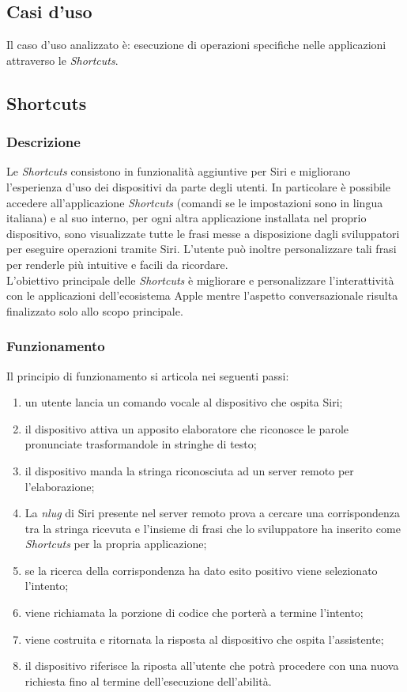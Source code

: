 	\subsection{Casi d'uso}
	Il caso d'uso analizzato è: esecuzione di operazioni specifiche nelle applicazioni attraverso le \emph{Shortcuts}.
	\subsection{Shortcuts}
		\subsubsection{Descrizione}
		Le \emph{Shortcuts} consistono in funzionalità aggiuntive per Siri e migliorano l'esperienza d'uso dei dispositivi da parte degli utenti. In particolare è possibile accedere all'applicazione \emph{Shortcuts} (comandi se le impostazioni sono in lingua italiana) e al suo interno, per ogni altra applicazione installata nel proprio dispositivo, sono visualizzate tutte le frasi messe a disposizione dagli sviluppatori per eseguire operazioni tramite Siri. L'utente può inoltre personalizzare tali frasi per renderle più intuitive e facili da ricordare. \\
		L'obiettivo principale delle \emph{Shortcuts} è migliorare e personalizzare l'interattività con le applicazioni dell'ecosistema Apple mentre l'aspetto conversazionale risulta finalizzato solo allo scopo principale.
		\subsubsection{Funzionamento}
		Il principio di funzionamento si articola nei seguenti passi:
		\begin{enumerate}
			\item un utente lancia un comando vocale al dispositivo che ospita Siri;
			\item il dispositivo attiva un apposito elaboratore che riconosce le parole pronunciate trasformandole in stringhe di testo;
			\item il dispositivo manda la stringa riconosciuta ad un server remoto per l'elaborazione;
			\item La \emph{\gls{nlug}} di Siri presente nel server remoto prova a cercare una corrispondenza tra la stringa ricevuta e l'insieme di frasi che lo sviluppatore ha inserito come \emph{Shortcuts} per la propria applicazione;
			\item se la ricerca della corrispondenza ha dato esito positivo viene selezionato l'intento;
			\item viene richiamata la porzione di codice che porterà a termine l'intento;
			\item viene costruita e ritornata la risposta al dispositivo che ospita l'assistente;
			\item il dispositivo riferisce la riposta all'utente che potrà procedere con una nuova richiesta fino al termine dell'esecuzione dell'abilità.
		\end{enumerate}
